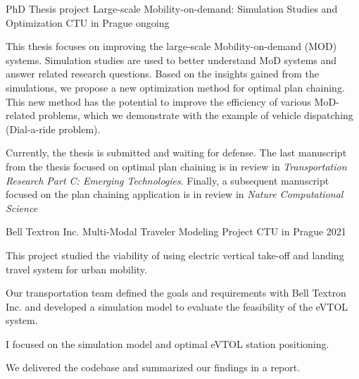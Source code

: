 

\begin{cventries}

  \cventry
    {PhD Thesis project} %
    {Large-scale Mobility-on-demand: Simulation Studies and Optimization} %
    {CTU in Prague} %
    {ongoing} %
    {
      \begin{cvitems} %
        \item {This thesis focuses on improving the large-scale Mobility-on-demand (MOD) systems.  
        Simulation studies are used to better understand MoD systems and answer related research questions. 
        Based on the insights gained from the simulations, we propose a new optimization method for optimal plan chaining.
        This new method has the potential to improve the efficiency of various MoD-related problems, which we demonstrate with the example of vehicle dispatching (Dial-a-ride problem).
        }
        \item {Currently, the thesis is submitted and waiting for defense. The last manuscript from the thesis focused on optimal plan chaining is in review in \emph{Transportation Research Part C: Emerging Technologies}.
        Finally, a subsequent manuscript focused on the plan chaining application is in review in \emph{Nature Computational Science}
        }
      \end{cvitems}
    }

    

  \cventry
    {Bell Textron Inc. Multi-Modal Traveler Modeling Project} %
    {
    } %
    {CTU in Prague} %
    {2021} %
    {
      \begin{cvitems} %
        \item {This project studied the viability of using electric vertical take-off and landing travel system for urban mobility.}
        \item {Our transportation team defined the goals and requirements with Bell Textron Inc. and developed a simulation model to evaluate the feasibility of the eVTOL system.}
        \item I focused on the simulation model and optimal eVTOL station positioning.
        \item {We delivered the codebase and summarized our findings in a report.}
      \end{cvitems}
    }
\end{cventries}


